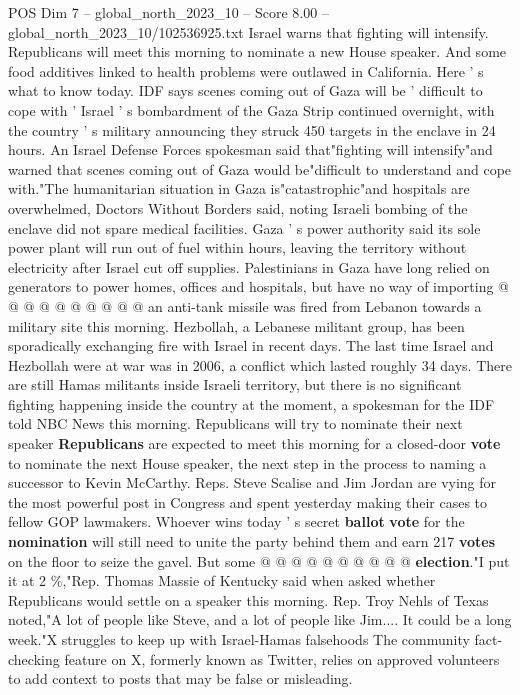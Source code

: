 \begin{textsample}{POS Dim 7 – global\_north\_2023\_10 – Score 8.00 – global\_north\_2023\_10/102536925.txt}  \label{ex:f7_pos_250}
Israel warns that fighting will intensify.
Republicans will meet this morning to nominate a new House speaker.
And some food additives linked to health problems were outlawed in California.
Here ' s what to know today.
IDF says scenes coming out of Gaza will be ' difficult to cope with ' Israel ' s bombardment of the Gaza Strip continued overnight, with the country ' s military announcing they struck 450 targets in the enclave in 24 hours.
An Israel Defense Forces spokesman said that"fighting will intensify"and warned that scenes coming out of Gaza would be"difficult to understand and cope with."The humanitarian situation in Gaza is"catastrophic"and hospitals are overwhelmed, Doctors Without Borders said, noting Israeli bombing of the enclave did not spare medical facilities.
Gaza ' s power authority said its sole power plant will run out of fuel within hours, leaving the territory without electricity after Israel cut off supplies.
Palestinians in Gaza have long relied on generators to power homes, offices and hospitals, but have no way of importing @ @ @ @ @ @ @ @ @ @ an anti-tank missile was fired from Lebanon towards a military site this morning.
Hezbollah, a Lebanese militant group, has been sporadically exchanging fire with Israel in recent days.
The last time Israel and Hezbollah were at war was in 2006, a conflict which lasted roughly 34 days.
There are still Hamas militants inside Israeli territory, but there is no significant fighting happening inside the country at the moment, a spokesman for the IDF told NBC News this morning.
Republicans will try to nominate their next speaker \textbf{Republicans} are expected to meet this morning for a closed-door \textbf{vote} to nominate the next House speaker, the next step in the process to naming a successor to Kevin McCarthy.
Reps.
Steve Scalise and Jim Jordan are vying for the most powerful post in Congress and spent yesterday making their cases to fellow GOP lawmakers.
Whoever wins today ' s secret \textbf{ballot} \textbf{vote} for the \textbf{nomination} will still need to unite the party behind them and earn 217 \textbf{votes} on the floor to seize the gavel.
But some @ @ @ @ @ @ @ @ @ @ \textbf{election}."I put it at 2 \%,"Rep.
Thomas Massie of Kentucky said when asked whether Republicans would settle on a speaker this morning.
Rep.
Troy Nehls of Texas noted,"A lot of people like Steve, and a lot of people like Jim....
It could be a long week."X struggles to keep up with Israel-Hamas falsehoods The community fact-checking feature on X, formerly known as Twitter, relies on approved volunteers to add context to posts that may be false or misleading.

\end{textsample}
